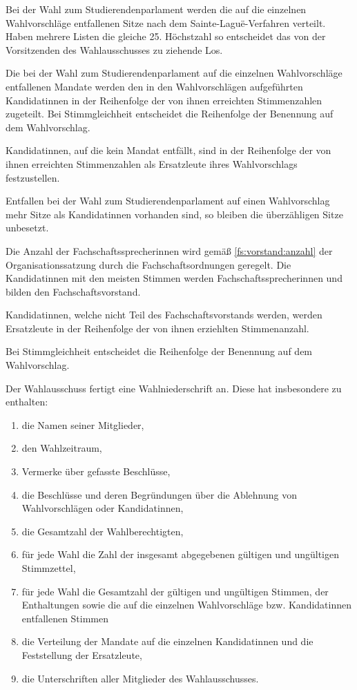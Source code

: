 \label{wahl:sitzverteilungstupa}
Bei der Wahl zum Studierendenparlament werden die auf die einzelnen Wahlvorschläge entfallenen Sitze nach dem Sainte-Laguë-Verfahren verteilt. Haben mehrere Listen die gleiche 25. Höchstzahl so entscheidet das von der Vorsitzenden des Wahlausschusses zu ziehende Los.

Die bei der Wahl zum Studierendenparlament auf die einzelnen Wahlvorschläge entfallenen Mandate werden den in den Wahlvorschlägen aufgeführten Kandidatinnen in der Reihenfolge der von ihnen erreichten Stimmenzahlen zugeteilt. Bei Stimmgleichheit entscheidet die Reihenfolge der Benennung auf dem Wahlvorschlag.

Kandidatinnen, auf die kein Mandat entfällt, sind in der Reihenfolge der von ihnen erreichten Stimmenzahlen als Ersatzleute ihres Wahlvorschlags festzustellen. 

Entfallen bei der Wahl zum Studierendenparlament auf einen Wahlvorschlag mehr Sitze als Kandidatinnen vorhanden sind, so bleiben die überzähligen Sitze unbesetzt.

\label{wahl:fsvorstaende}
Die Anzahl der Fachschaftssprecherinnen wird gemäß \ref{fs:vorstand:anzahl} der Organisationssatzung durch die Fachschaftsordnungen geregelt. Die Kandidatinnen mit den meisten Stimmen werden Fachschaftssprecherinnen und bilden den Fachschaftsvorstand. 

Kandidatinnen, welche nicht Teil des Fachschaftsvorstands werden, werden Ersatzleute in der Reihenfolge der von ihnen erziehlten Stimmenanzahl. 

Bei Stimmgleichheit entscheidet die Reihenfolge der Benennung auf dem Wahlvorschlag.

\label{wahl:wahlniederschrift}
Der Wahlausschuss fertigt eine Wahlniederschrift an. Diese hat insbesondere zu enthalten: 
\begin{enumerate}
    \item die Namen seiner Mitglieder,
    \item den Wahlzeitraum,
    \item Vermerke über gefasste Beschlüsse,
    \item die Beschlüsse und deren Begründungen über die Ablehnung von Wahlvorschlägen oder Kandidatinnen,
    \item die Gesamtzahl der Wahlberechtigten,
    \item für jede Wahl die Zahl der insgesamt abgegebenen gültigen und ungültigen Stimmzettel,
    \item für jede Wahl die Gesamtzahl der gültigen und ungültigen Stimmen, der Enthaltungen sowie die auf die einzelnen Wahlvorschläge bzw. Kandidatinnen entfallenen Stimmen
    \item die Verteilung der Mandate auf die einzelnen Kandidatinnen und die Feststellung der Ersatzleute,
    \item die Unterschriften aller Mitglieder des Wahlausschusses.
\end{enumerate}

